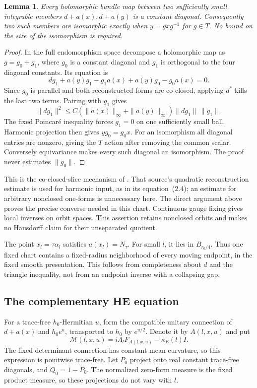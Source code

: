\documentclass[11pt]{amsart}
\newtheorem{lemma}[theorem]{Lemma}
\theoremstyle{definition}
\theoremstyle{remark}
\begin{document}
\begin{lemma}\label{lem:wall-orbit-converse}
Every holomorphic bundle map between two sufficiently small integrable
members $d+a(x),d+a(y)$ is a constant diagonal. Consequently two such
members are isomorphic exactly when $y=gxg^{-1}$ for $g\in T$.
No bound on the size of the isomorphism is required.
\end{lemma}
\begin{proof}
In the full endomorphism space decompose a holomorphic map as
$g=g_0+g_1$, where $g_0$ is a constant diagonal and $g_1$ is
orthogonal to the four diagonal constants. Its equation is
\[
 dg_1+a(y)g_1-g_1a(x)+a(y)g_0-g_0a(x)=0.
\]
Since $g_0$ is parallel and both reconstructed forms are co-closed,
applying $d^*$ kills the last two terms. Pairing with $g_1$ gives
\[
 \|dg_1\|^2\le C(\|a(x)\|_\infty+\|a(y)\|_\infty)
                   \|dg_1\|\,\|g_1\|.
\]
The fixed Poincar\'e inequality forces $g_1=0$ on one sufficiently
small ball. Harmonic projection then gives $yg_0=g_0x$.
For an isomorphism all diagonal entries are nonzero, giving the
$T$ action after removing the common scalar. Conversely equivariance
makes every such diagonal an isomorphism. The proof never estimates
$\|g_0\|$.
\end{proof}

This is the co-closed-slice mechanism of
\cite[Proposition~4.5 and Corollary~4.6]{BuchdahlSchumacher20}.
That source's quadratic reconstruction estimate is used for harmonic
input, as in its equation~(2.4); an estimate for arbitrary nonclosed
one-forms is unnecessary here. The direct argument above proves the
precise converse needed in this chart. Continuous gauge fixing gives
local inverses on orbit spaces. This assertion retains nonclosed
orbits and makes no Hausdorff claim for their unseparated quotient.

The point $x_l=\tau\alpha_l$ satisfies $a(x_l)=N_\tau$.
For small $l$, it lies in $B_{r_0/4}$. Thus one fixed chart contains
a fixed-radius neighborhood of every moving endpoint, in the fixed
smooth presentation. This follows from completeness about $d$ and
the triangle inequality, not from an endpoint inverse with a collapsing
gap.

\subsection{The complementary HE equation}
For a trace-free $h_0$-Hermitian $u$, form the compatible unitary
connection of $d+a(x)$ and $h_0e^u$, transported to $h_0$ by
$e^{u/2}$. Denote it by $A(l,x,u)$ and put
\[
 \mathcal M(l,x,u)=i\Lambda_lF_{A(l,x,u)}-\kappa_E(l)I.
\]
The fixed determinant connection has constant mean curvature, so this
expression is pointwise trace-free. Let $P_0$ project onto real
constant trace-free diagonals, and $Q_0=1-P_0$. The normalized
zero-form measure is the fixed product measure, so these projections
do not vary with $l$.
\end{document}

